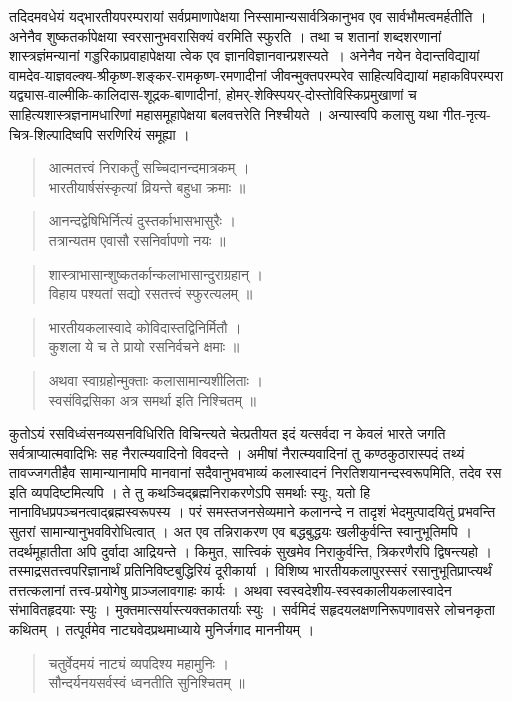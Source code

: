 {\dev तदिदमवधेयं यद्भारतीयपरम्परायां सर्वप्रमाणापेक्षया निस्सामान्यसार्वत्रिकानुभव एव सार्व\-भौमत्वमर्हतीति । अनेनैव शुष्कतर्कापेक्षया स्वरसानुभवरासिक्यं वरमिति स्फुरति । तथा च शतानां शब्दशरणानां शास्त्रज्ञंमन्यानां गड्डरिकाप्रवाहापेक्षया त्वेक एव ज्ञानविज्ञानवान्प्रश\-स्यते~। अनेनैव नयेन वेदान्तविद्यायां  वामदेव-याज्ञवल्क्य-श्रीकृष्ण-शङ्कर-रामकृष्ण-रमणा\-दीनां जीवन्मुक्तपरम्परेव साहित्यविद्यायां महाकविपरम्परा यद्व्यास-वाल्मीकि-कालिदास-शूद्रक-बाणादीनां, होमर्-शेक्स्पियर्-दोस्तोविस्किप्रमुखाणां च साहित्यशास्त्रज्ञनामधारिणां महासमूहापेक्षया बलवत्तरेति निश्चीयते । अन्यास्वपि कलासु यथा गीत-नृत्य-चित्र-शिल्पादिष्वपि सरणिरियं समूह्या ।}
\begin{quote}
{\dev आत्मतत्त्वं निराकर्तुं सच्चिदानन्दमात्रकम् ।}\\
{\dev भारतीयार्षसंस्कृत्यां व्रियन्ते बहुधा क्रमाः ॥}
\end{quote}
\begin{quote}
{\dev आनन्दद्वेषिभिर्नित्यं दुस्तर्काभासभासुरैः ।}\\
{\dev तत्रान्यतम एवासौ रसनिर्वापणो नयः ॥}
\end{quote}
\begin{quote}
{\dev शास्त्राभासान्शुष्कतर्कान्कलाभासान्दुराग्रहान् ।}\\
{\dev विहाय पश्यतां सद्यो रसतत्त्वं स्फुरत्यलम् ॥}
\end{quote}
\begin{quote}
{\dev भारतीयकलास्वादे कोविदास्तद्विनिर्मितौ ।}\\
{\dev कुशला ये च ते प्रायो रसनिर्वचने क्षमाः ॥}
\end{quote}
\begin{quote}
{\dev अथवा स्वाग्रहोन्मुक्ताः कलासामान्यशीलिताः ।}\\
{\dev स्वसंविद्रसिका अत्र समर्था इति निश्चितम् ॥}
\end{quote}

{\dev कुतोऽयं रसविध्वंसनव्यसनविधिरिति विचिन्त्यते चेत्प्रतीयत इदं यत्सर्वदा न केवलं भारते जगति सर्वत्राप्यात्मवादिभिः सह नैरात्म्यवादिनो विवदन्ते । अमीषां नैरात्म्यवादिनां तु कण्ठ\-कुठारास्पदं तथ्यं तावज्जगतीहैव सामान्यानामपि मानवानां सदैवानुभवभाव्यं कलास्वादनं निरतिशयानन्दस्वरूपमिति, तदेव रस इति व्यपदिष्टमित्यपि । ते तु कथञ्चिद्ब्रह्मनिराकरणेऽपि समर्थाः स्युः, यतो हि नानाविधप्रपञ्चनत्वाद्ब्रह्मस्वरूपस्य । परं समस्तजनसेव्यमाने कलानन्दे न तादृशं भेदमुत्पादयितुं प्रभवन्ति सुतरां सामान्यानुभवविरोधित्वात् । अत एव तन्निराकरण एव बद्धबुद्धयः खलीकुर्वन्ति स्वानुभूतिमपि । तदर्थमूहातीता अपि दुर्वादा आद्रियन्ते । किमुत, सात्त्विकं सुखमेव निराकुर्वन्ति, त्रिकरणैरपि द्विषन्त्यहो । तस्माद्रसतत्त्वपरिज्ञानार्थं  प्रतिनिविष्टबुद्धिरियं दूरीकार्या । विशिष्य भारतीयकलापुरस्सरं रसानुभूतिप्राप्त्यर्थं तत्तत्कलानां तत्त्व-प्रयोगेषु प्राञ्जलावगाहः कार्यः । अथवा स्वस्वदेशीय-स्वस्वकालीयकलास्वादेन संभावितहृदयाः स्युः । मुक्तमात्सर्यास्त्यक्तकातर्याः स्युः । सर्वमिदं सहृदयलक्षणनिरूपणावसरे लोचनकृता कथितम् । तत्पूर्वमेव नाट्यवेदप्रथमाध्याये मुनिर्जगाद माननीयम् ।}   
\begin{quote}
{\dev चतुर्वेदमयं नाट्यं व्यपदिश्य महामुनिः ।}\\
{\dev सौन्दर्यनयसर्वस्वं ध्वनतीति सुनिश्चितम् ॥}
\end{quote}

